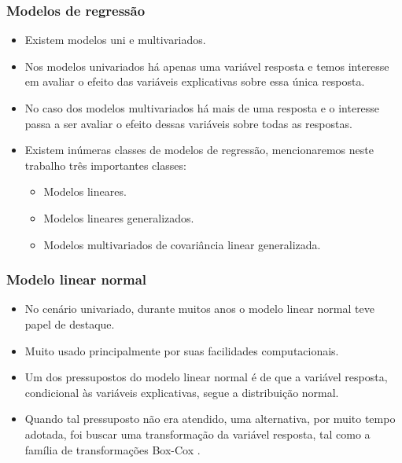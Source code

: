 \documentclass[10pt,
  aspectratio=169,
  serif,
  mathserif,
  professionalfont,
  compress,
  handout,
  ]{beamer}\usepackage[]{graphicx}\usepackage[]{color}
\begin{document}

\begin{frame}
  \frametitle{Modelos de regressão}

  \begin{itemize}
    \itemsep 2ex

  \item Existem modelos uni e multivariados. 
  
  \item Nos modelos univariados há apenas uma variável resposta e temos interesse em avaliar o efeito das variáveis explicativas sobre essa única resposta.
  
  \item No caso dos modelos multivariados há mais de uma resposta e o interesse passa a ser avaliar o efeito dessas variáveis sobre todas as respostas. 
  
  \item Existem inúmeras classes de modelos de regressão, mencionaremos neste trabalho três importantes classes: 
  \begin{itemize}
  \item Modelos lineares.
  \item Modelos lineares generalizados.
  \item Modelos multivariados de covariância linear generalizada. 
\end{itemize}

  \end{itemize}
\end{frame}



\begin{frame}
  \frametitle{Modelo linear normal}

  \begin{itemize}
    \itemsep 2ex

  \item No cenário univariado, durante muitos anos o modelo linear normal \cite{galton} teve papel de destaque.
  
  \item Muito usado principalmente por suas facilidades computacionais. 
  
  \item Um dos pressupostos do modelo linear normal é de que a variável resposta, condicional às variáveis explicativas, segue a distribuição normal. 
  
  \item Quando tal pressuposto não era atendido, uma alternativa, por muito tempo adotada, foi buscar uma transformação da variável resposta, tal como a família de transformações Box-Cox \cite{boxcox64}. 
  
  \end{itemize}
\end{frame}
\end{document}
